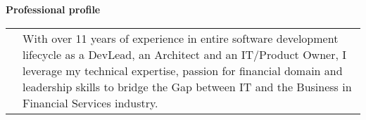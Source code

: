 \textbf{Professional profile}
\\
\begin{tabular}{p{}|p{}}
&With over 11 years of experience in entire software development lifecycle as a DevLead, an Architect and an IT/Product Owner, I leverage my technical expertise, passion for financial domain and leadership skills to bridge the Gap between IT and the Business in Financial Services industry.\\
\end{tabular}